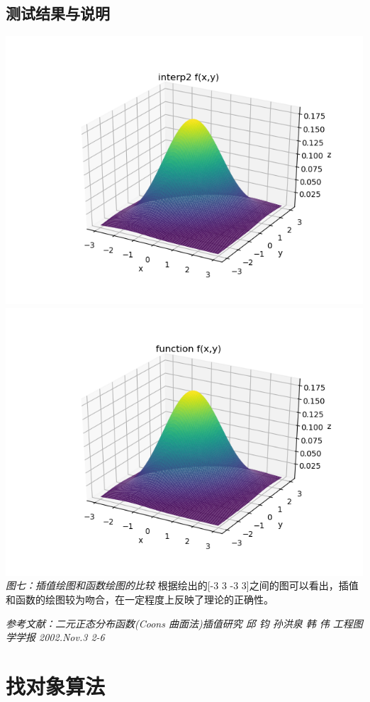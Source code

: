 \documentclass[UTF8,a4paper]{article}
\begin{document}
\subsection{测试结果与说明}
\begin{center}
\includegraphics[scale=0.5]{Figure_1.png}
\includegraphics[scale=0.5]{Figure_2.png}\\
\textit{图七：插值绘图和函数绘图的比较}
根据绘出的[-3 3 -3 3]之间的图可以看出，插值和函数的绘图较为吻合，在一定程度上反映了理论的正确性。\\
\end{center}
\textit{参考文献：二元正态分布函数(Coons 曲面法)插值研究  邱 钧 孙洪泉 韩 伟 工程图学学报 2002.Nov.3 2-6}
\newpage
\section{找对象算法}
\end{document}
